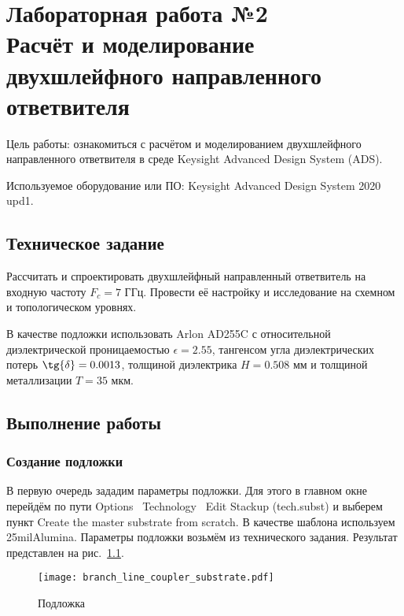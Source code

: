\chapter{Лабораторная работа №2 \\
Расчёт и моделирование двухшлейфного направленного ответвителя}

Цель работы: ознакомиться с расчётом и моделированием двухшлейфного направленного ответвителя в среде Keysight Advanced Design System (ADS).

Используемое оборудование или ПО: Keysight Advanced Design System 2020 upd1.

\section{Техническое задание}

Рассчитать и спроектировать двухшлейфный направленный ответвитель на входную частоту $F_c = 7 \text{~ГГц}$.
Провести её настройку и исследование на схемном и топологическом уровнях.

В качестве подложки использовать Arlon AD255C с относительной диэлектрической проницаемостью $\epsilon = 2.55$, тангенсом угла диэлектрических потерь $\tg{\delta} = 0.0013$, толщиной диэлектрика $H = 0.508 \text{~мм}$ и толщиной металлизации $T = 35 \text{~мкм}$.

\section{Выполнение работы}

\subsection{Создание подложки}

В первую очередь зададим параметры подложки. Для этого в главном окне перейдём по пути Options \textrightarrow\ Technology \textrightarrow\ Edit Stackup (tech.subst) и выберем пункт Create the master substrate from scratch.
В качестве шаблона используем 25milAlumina.
Параметры подложки возьмём из технического задания.
Результат представлен на рис.~\ref{fig:branch_line_coupler_substrate}.

\begin{figure}
    \centering
    \texttt{[image: branch\_line\_coupler\_substrate.pdf]}
    \caption{Подложка}%
    \label{fig:branch_line_coupler_substrate}
\end{figure}


